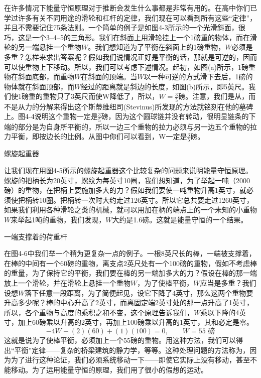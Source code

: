\documentclass[11pt,oneside]{book}
\begin{document}
\begin{common-format}
在许多情况下能量守恒原理对于推断会发生什么事都是非常有用的。在高中你们已学过许多有关不同用途的滑轮和杠杆的定律，我们现在可以看到所有这些“定律”，并且不需要记住75条法则。一个简单的例子是如图4-3所示的一个光滑斜面，很巧，这是一个3--4--5的三角形。我们在斜面上用滑轮挂上一个1磅重的物体，而在滑轮的另一端悬挂一个重物$ W $。我们想知道为了平衡在斜面上的1磅重物，$ W $必须是多重？怎样来求出答案呢？假如我们说情况正好是平衡的话，那就是可逆的，因而可以使重物上下移动。所以，我们可以考虑下述情况。起初，如图(a)所示，1磅重物在斜面底部，而重物$ W $在斜面的顶端。当$ W $以一种可逆的方式滑下去后，1磅的物体就在斜面顶部，而$ W $经过的距离就是斜边的长度，如图(b)所示，即5英尺。我们使1磅重的重物只了3英尺而使W降低了，所以，$ W=\frac{3}{5} $磅。注意，我们是从，而不是从力的分解来得出这个斯蒂维纽司(Stevinus)所发现的方法就铭刻在他的墓碑上。图4-4说明这个重物一定是$ \frac{3}{5} $磅，因为这个圆球链并没有转动，很明显链条的下端的部分是为自身所平衡的，所以一边三个重物的拉力必须与另一边五个重物的拉力平衡，即按边长的比例。从图中你们可以看到，W一定是$ \frac{3}{5} $磅。
\begin{fig}{螺旋起重器}
\label{fig:螺旋起重器}
\end{fig}
让我们现在用图4-5所示的螺旋起重器这个比较复杂的问题来说明能量守恒原理。螺旋的把柄长为20英寸，螺纹为每英寸10圈，我们想知道，为了举起一吨（2000磅）的重物，在把柄上要施加多大的力？假如我们要使一吨重物升高1英寸，就必须使把柄转10圈。把柄转一次时大约走过126英寸。所以它总共要走过1260英寸，如果我们利用各种滑轮之类的机械，就可以用加在柄的端点上的一个未知的小重物$ W $来举起1吨的重物，我们发现，$ W $大约是1.6磅。这就是能量守恒的一个结果。
\begin{fig}{一端支撑着的荷重杆}
\label{fig:一端支撑着的荷重杆}
\end{fig}
在图4-6中我们举一个稍为更复杂一点的例子。一根8英尺长的棒，一端被支撑着，在棒的中间有一个60磅的重物，离支点2英尺处有一个100磅的重物，假如不考虑棒的重量，为了保持它的平衡，我们要在棒的另一端加多大的力？假设在棒的那一端放上一个滑轮，并在滑轮上悬挂一个重物$ W $，为了使棒平衡，$ W $应当是多重？我们设想$ W $落下任意一段距离，为了简便起见，设它下降了4英寸，那么这两个重物要升高多少呢？棒的中心升高了2英寸，而离固定端2英寸处的那一点升高了1英寸，所以，各个重物与高度的乘积之和不变，这个原理告诉我们，$ W $乘以下降的4英寸，加上60磅乘以升高的2英寸，再加上100磅乘以升高的1英寸，其和必定是零。
\begin{equation}
\label{Eq:I:4:5}
-4W+(2)(60)+(1)(100)=0,\qquad
W=\text{$55$ 磅}
\end{equation}
这就是说为了使棒平衡，必须加上一个55磅的重物。用这种方法，我们可以得出“平衡”定律——复杂的桥梁建筑的静力学，等等。这种处理问题的方法称为，因为为了进行这种论证，我们必须系统移动一下——即使它实际上没有移动，甚至不能移动。为了运用能量守恒的原理，我们用了很小的假想的运动。




\end{common-format}
\end{document}
